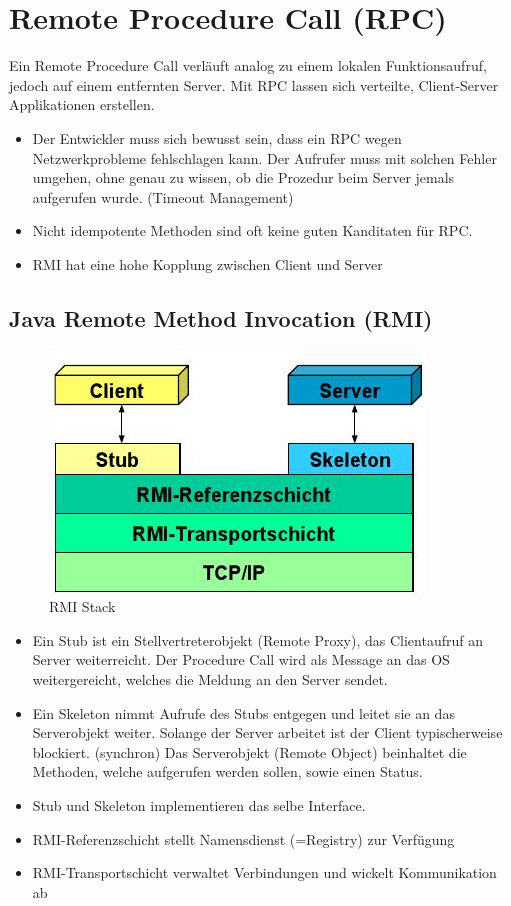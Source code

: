 \section{Remote Procedure Call (RPC)}
Ein Remote Procedure Call verläuft analog zu einem lokalen Funktionsaufruf, jedoch auf einem entfernten Server. Mit RPC lassen sich verteilte, Client-Server Applikationen erstellen.

\begin{itemize}
	\item Der Entwickler muss sich bewusst sein, dass ein RPC wegen Netzwerkprobleme fehlschlagen kann. Der Aufrufer muss mit solchen Fehler umgehen, ohne genau zu wissen, ob die Prozedur beim Server jemals aufgerufen wurde. (Timeout Management)
	\item Nicht idempotente Methoden sind oft keine guten Kanditaten für RPC.
	\item RMI hat eine hohe Kopplung zwischen Client und Server
\end{itemize}

\subsection{Java Remote Method Invocation (RMI)}
\begin{figure}[h]
	\centering
	\includegraphics[width=0.5\linewidth]{img/rmi_stack}
	\caption{RMI Stack}
	\label{fig:rmistack}
\end{figure}

\begin{itemize}
	\item Ein Stub ist ein Stellvertreterobjekt (Remote Proxy), das Clientaufruf an Server weiterreicht. Der Procedure Call wird als Message an das OS weitergereicht, welches die Meldung an den Server sendet.
	\item Ein Skeleton nimmt Aufrufe des Stubs entgegen und leitet sie an das Serverobjekt weiter. Solange der Server arbeitet ist der Client typischerweise blockiert. (synchron) Das Serverobjekt (Remote Object) beinhaltet die Methoden, welche aufgerufen werden sollen, sowie einen Status.
	\item Stub und Skeleton implementieren das selbe Interface.
	\item RMI-Referenzschicht stellt Namensdienst (=Registry) zur Verfügung
	\item RMI-Transportschicht verwaltet Verbindungen und wickelt Kommunikation ab
\end{itemize}

